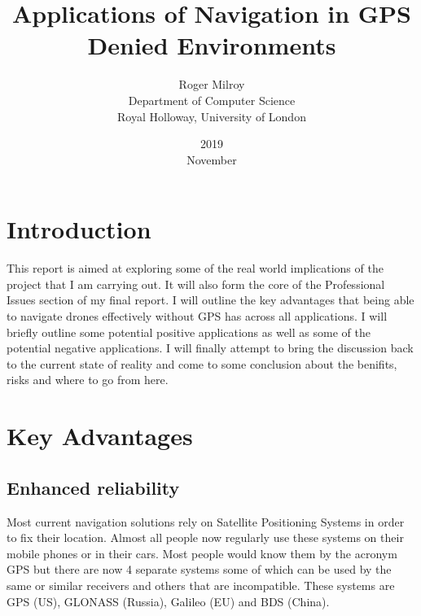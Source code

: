 \documentclass[]{article}
\begin{document}
\title{Applications of Navigation in GPS Denied Environments}
\date{2019\\ November}
\author{Roger Milroy\\ Department of Computer Science\\ Royal Holloway, University of London}

\maketitle

\section{Introduction}

This report is aimed at exploring some of the real world implications of the project that I am carrying out. It will also form the core of the Professional Issues section of my final report.
I will outline the key advantages that being able to navigate drones effectively without GPS has across all applications. 
I will briefly outline some potential positive applications as well as some of the potential negative applications.
I will finally attempt to bring the discussion back to the current state of reality and come to some conclusion about the benifits, risks and where to go from here.


\section{Key Advantages}

\subsection{Enhanced reliability}

Most current navigation solutions rely on Satellite Positioning Systems in order to fix their location.
Almost all people now regularly use these systems on their mobile phones or in their cars. 
Most people would know them by the acronym GPS but there are now 4 separate systems some of which can be used by the same or similar receivers and others that are incompatible.
These systems are GPS (US), GLONASS (Russia), Galileo (EU) and BDS (China).
\end{document}
